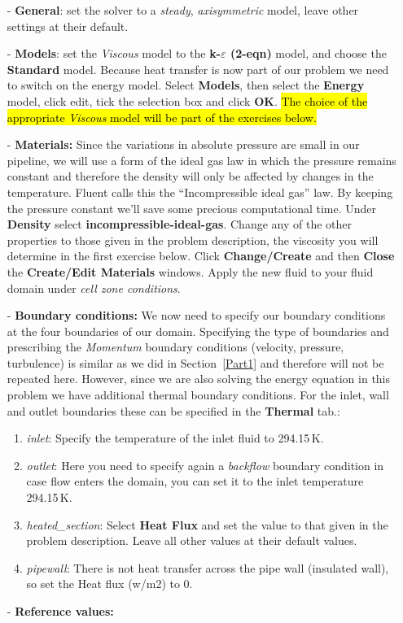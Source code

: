 \documentclass[11pt,a4paper,oneside]{scrartcl}
\newcommand\bfr[1]{\textcolor[rgb]{1,0.00,0.00}{\textbf{\textsf{#1}}}}
\begin{document}
\begin{itemize}
    \item[-] \textbf{General}: set the solver to a \emph{steady}, \emph{axisymmetric} model, leave other settings at their default.
    \item[-] \textbf{Models}: set the \emph{Viscous} model to the \bfr{k-$\varepsilon$ (2-eqn)} model, and choose the \bfr{Standard} model. Because heat transfer is now part of our problem we need to switch on the energy model. Select \bfr{Models}, then select the \bfr{Energy} model, click edit, tick the selection box and click \bfr{OK}. \hl{The choice of the appropriate \emph{Viscous} model will be part of the exercises below.}

    \item[-] \textbf{Materials:} Since the variations in absolute pressure are small in our pipeline, we will use a form of the ideal gas law in which the pressure remains constant and therefore the density will only be affected by changes in the temperature. Fluent calls this the ``Incompressible ideal gas'' law. By keeping the pressure constant we'll save some precious computational time. Under \bfr{Density} select \bfr{incompressible-ideal-gas}. Change any of the other properties to those given in the problem description, the viscosity you will determine in the first exercise below. Click \bfr{Change/Create} and then \bfr{Close} the \bfr{Create/Edit Materials} windows. Apply the new fluid to your fluid domain under \emph{cell zone conditions}.
    \item[-] \textbf{Boundary conditions:} We now need to specify our boundary conditions at the four boundaries of our domain. Specifying the type of boundaries and prescribing the \emph{Momentum} boundary conditions (velocity, pressure, turbulence) is similar as we did in Section~\ref{Part1} and therefore will not be repeated here. However, since we are also solving the energy equation in this problem we have additional thermal boundary conditions. For the inlet, wall and outlet boundaries these can be specified in the \bfr{Thermal} tab.:
    \begin{enumerate}
    \item \emph{inlet}: Specify the temperature of the inlet fluid to 294.15\,K.
    \item \emph{outlet}: Here you need to specify again a \emph{backflow} boundary condition in case flow enters the domain, you can set it to the inlet temperature 294.15\,K.
    \item \emph{heated\_section}: Select \bfr{Heat Flux} and set the value to that given in the problem description. Leave all other values at their default values.
    \item \emph{pipewall}: There is not heat transfer across the pipe wall (insulated wall), so set the Heat flux (w/m2) to 0.
    \end{enumerate}

    \item[-] \textbf{Reference values: }
\end{itemize}
\end{document}
